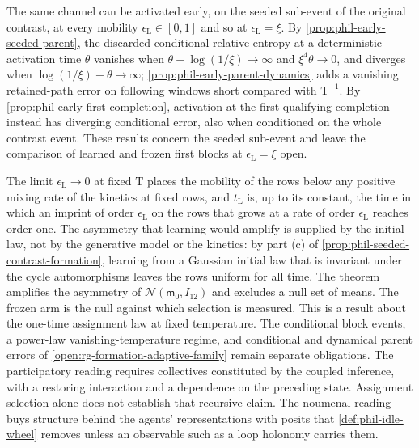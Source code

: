 The same channel can be activated early, on the seeded sub-event of the
original contrast, at every mobility \(\epsilon_{\mathrm L}\in[0,1]\) and so
at \(\epsilon_{\mathrm L}=\xi\). By \cref{prop:phil-early-seeded-parent}, the
discarded conditional relative entropy at a deterministic activation time
\(\theta\) vanishes when \(\theta-\log(1/\xi)\to\infty\) and
\(\xi^4\theta\to0\), and diverges when
\(\log(1/\xi)-\theta\to\infty\); \cref{prop:phil-early-parent-dynamics} adds a
vanishing retained-path error on following windows short compared with
\(\mathrm T^{-1}\). By \cref{prop:phil-early-first-completion}, activation at
the first qualifying completion instead has diverging conditional error, also
when conditioned on the whole contrast event. These results concern the seeded
sub-event and leave the comparison of learned and frozen first blocks at
\(\epsilon_{\mathrm L}=\xi\) open.

The limit \(\epsilon_{\mathrm L}\to0\) at fixed \(\mathrm T\) places the
mobility of the rows below any positive mixing rate of the kinetics at fixed
rows, and \(t_{\mathrm L}\) is, up to its constant, the time in which an imprint
of order \(\epsilon_{\mathrm L}\) on the rows that grows at a rate of order
\(\epsilon_{\mathrm L}\) reaches order one. The asymmetry that learning would
amplify is supplied by the initial law, not by the generative model or the
kinetics: by part (c) of \cref{prop:phil-seeded-contrast-formation}, learning
from a Gaussian initial law that is invariant under the cycle automorphisms
leaves the rows uniform for all time. The theorem amplifies the asymmetry of
\(\mathcal N(\mathsf m_0,I_{12})\) and excludes a null set of means. The frozen
arm is the null against which selection is measured. This is a result about
the one-time assignment law at fixed temperature. The conditional block
events, a power-law vanishing-temperature regime, and conditional and dynamical parent
errors of \cref{open:rg-formation-adaptive-family} remain separate obligations.
The participatory reading requires collectives constituted by the coupled
inference, with a restoring interaction and a dependence on the preceding
state. Assignment selection alone does not establish that recursive claim. The noumenal reading buys structure behind the
agents' representations with posits that \cref{def:phil-idle-wheel} removes
unless an observable such as a loop holonomy carries them.

